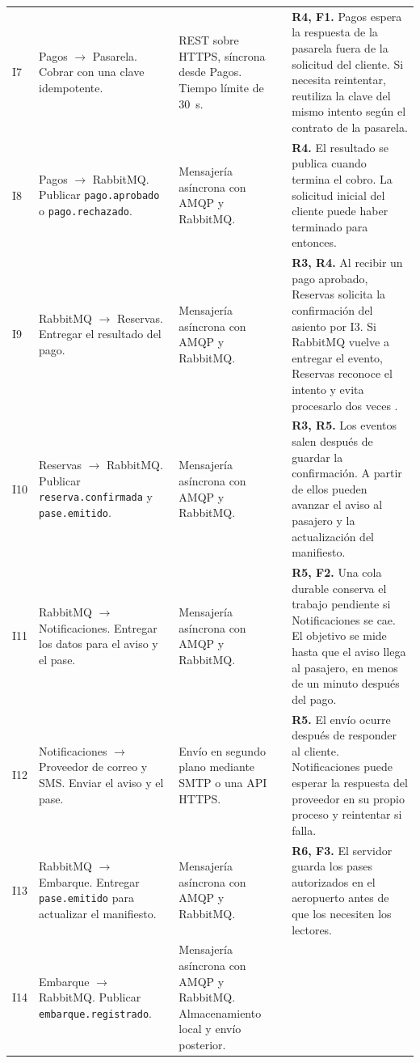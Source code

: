 \documentclass[11pt,a4paper]{article}
\newcommand{\flecha}{\(\to\)}
\begin{document}
{\begin{longtable}{@{}P{0.75cm}P{4.25cm}P{4.1cm}P{7.2cm}@{}}
\addlinespace
I7 & Pagos \flecha{} Pasarela. Cobrar con una clave idempotente.
& REST sobre HTTPS, síncrona desde Pagos. Tiempo límite de 30~s.
& \textbf{R4, F1.} Pagos espera la respuesta de la pasarela fuera de la solicitud del cliente. Si necesita reintentar, reutiliza la clave del mismo intento según el contrato de la pasarela. \\
\addlinespace
I8 & Pagos \flecha{} RabbitMQ. Publicar \texttt{pago.aprobado} o \texttt{pago.rechazado}.
& Mensajería asíncrona con AMQP y RabbitMQ.
& \textbf{R4.} El resultado se publica cuando termina el cobro. La solicitud inicial del cliente puede haber terminado para entonces. \\
\addlinespace
I9 & RabbitMQ \flecha{} Reservas. Entregar el resultado del pago.
& Mensajería asíncrona con AMQP y RabbitMQ.
& \textbf{R3, R4.} Al recibir un pago aprobado, Reservas solicita la confirmación del asiento por I3. Si RabbitMQ vuelve a entregar el evento, Reservas reconoce el intento y evita procesarlo dos veces \cite{confirms}. \\
\addlinespace
I10 & Reservas \flecha{} RabbitMQ. Publicar \texttt{reserva.confirmada} y \texttt{pase.emitido}.
& Mensajería asíncrona con AMQP y RabbitMQ.
& \textbf{R3, R5.} Los eventos salen después de guardar la confirmación. A partir de ellos pueden avanzar el aviso al pasajero y la actualización del manifiesto. \\
\addlinespace
I11 & RabbitMQ \flecha{} Notificaciones. Entregar los datos para el aviso y el pase.
& Mensajería asíncrona con AMQP y RabbitMQ.
& \textbf{R5, F2.} Una cola durable conserva el trabajo pendiente si Notificaciones se cae. El objetivo se mide hasta que el aviso llega al pasajero, en menos de un minuto después del pago. \\
\addlinespace
I12 & Notificaciones \flecha{} Proveedor de correo y SMS. Enviar el aviso y el pase.
& Envío en segundo plano mediante SMTP o una API HTTPS.
& \textbf{R5.} El envío ocurre después de responder al cliente. Notificaciones puede esperar la respuesta del proveedor en su propio proceso y reintentar si falla. \\
\addlinespace
I13 & RabbitMQ \flecha{} Embarque. Entregar \texttt{pase.emitido} para actualizar el manifiesto.
& Mensajería asíncrona con AMQP y RabbitMQ.
& \textbf{R6, F3.} El servidor guarda los pases autorizados en el aeropuerto antes de que los necesiten los lectores. \\
\addlinespace
I14 & Embarque \flecha{} RabbitMQ. Publicar \texttt{embarque.registrado}.
& Mensajería asíncrona con AMQP y RabbitMQ. Almacenamiento local y envío posterior.

\end{longtable}}
\end{document}
